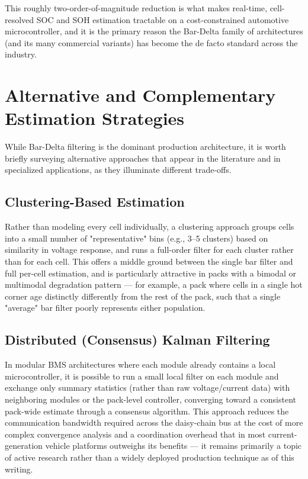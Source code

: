 This roughly two-order-of-magnitude reduction is what makes real-time, cell-resolved SOC and SOH estimation tractable on a cost-constrained automotive microcontroller, and it is the primary reason the Bar-Delta family of architectures (and its many commercial variants) has become the de facto standard across the industry.

\section{Alternative and Complementary Estimation Strategies}
\label{sec:14_alternatives}

While Bar-Delta filtering is the dominant production architecture, it is worth briefly surveying alternative approaches that appear in the literature and in specialized applications, as they illuminate different trade-offs.

\subsection{Clustering-Based Estimation}
\label{subsec:14_clustering}

Rather than modeling every cell individually, a clustering approach groups cells into a small number of "representative" bins (e.g., 3–5 clusters) based on similarity in voltage response, and runs a full-order filter for each cluster rather than for each cell. This offers a middle ground between the single bar filter and full per-cell estimation, and is particularly attractive in packs with a bimodal or multimodal degradation pattern — for example, a pack where cells in a single hot corner age distinctly differently from the rest of the pack, such that a single "average" bar filter poorly represents either population.

\subsection{Distributed (Consensus) Kalman Filtering}
\label{subsec:14_distributed}

In modular BMS architectures where each module already contains a local microcontroller, it is possible to run a small local filter on each module and exchange only summary statistics (rather than raw voltage/current data) with neighboring modules or the pack-level controller, converging toward a consistent pack-wide estimate through a consensus algorithm. This approach reduces the communication bandwidth required across the daisy-chain bus at the cost of more complex convergence analysis and a coordination overhead that in most current-generation vehicle platforms outweighs its benefits — it remains primarily a topic of active research rather than a widely deployed production technique as of this writing.

